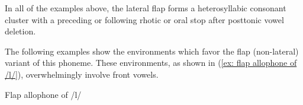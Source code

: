 In all of the examples above, the lateral flap forms a heterosyllabic consonant cluster with a preceding or following rhotic or oral stop after posttonic vowel deletion.

The following examples show the environments which favor the flap (non-lateral) variant of this phoneme.  These environments, as shown in (\ref{ex: flap allophone of /l/}), overwhelmingly involve front vowels.

\ea\label{ex: flap allophone of /l/}
{Flap allophone of /l/}

    \label{ex: flap allophone of /l/a}
        \label{ex: flap allophone of /l/b}
            \label{ex: flap allophone of /l/c}
                \label{ex: flap allophone of /l/d}
                    \label{ex: flap allophone of /l/e}
